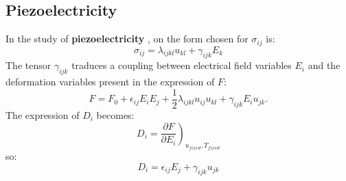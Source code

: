\documentclass[12pt]{book}
\begin{document}
\subsection{Piezoelectricity }\label{secpiezo}
In the study of {\bf piezoelectricity}
\cite{ph:elect:LandauEle}, on 
the form chosen for $\sigma_{ij}$ is:
\begin{equation}
\sigma_{ij}=\lambda_{ijkl}u_{kl}+\gamma_{ijk}E_k
\end{equation}
The tensor $\gamma_{ijk}$ traduces a coupling between electrical field
variables $E_i$ and the deformation variables present in the expression of
$F$: 
\begin{equation}
F=F_0+\epsilon_{ij}E_iE_j+\frac{1}{2}\lambda_{ijkl}u_{ij}u_{kl}+
\gamma_{ijk}E_iu_{jk}. 
\end{equation}
The expression of $D_i$ becomes:
\begin{equation}
D_i=\left.\frac{\partial F}{\partial E_i}\right)_{u_{fixed},T_{fixed}}
\end{equation}
so:
\begin{equation}
D_i=\epsilon_{ij}E_j+\gamma_{ijk}u_{jk}
\end{equation}
\end{document}
